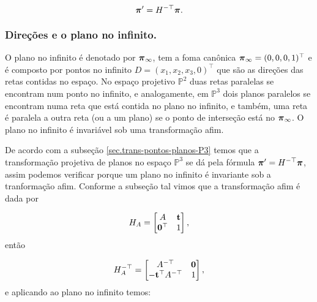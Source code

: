 \begin{equation*}
\boldsymbol{\pi}'=H^{-\top}\boldsymbol{\pi}.
\end{equation*}







\subsubsection{Direções e o plano no infinito.}\label{sec.direcoes-plano-infinito}

O plano no infinito é denotado por $\boldsymbol{\pi}_\infty$, tem a foma canônica $\boldsymbol{\pi}_\infty=(0,0,0,1)^\top$ e é composto por pontos no infinito $D=(x_1,x_2,x_3,0)^\top$ que são as direções das retas contidas no espaço. No espaço projetivo $\mathbb{P}^2$ duas retas paralelas se encontram num ponto no infinito, e analogamente, em  $\mathbb{P}^3$ dois planos paralelos se encontram numa reta que está contida no plano no infinito, e também, uma reta é paralela a outra reta (ou a um plano) se o ponto de interseção está no $\boldsymbol{\pi}_\infty$. O plano no infinito é invariável sob uma transformação afim.

De acordo com a subseção \ref{sec.trans-pontos-planos-P3} temos que a transformação projetiva de planos no espaço  $\mathbb{P}^3$ se dá pela fórmula $\boldsymbol{\pi}'=H^{-\top}\boldsymbol{\pi}$, assim podemos verificar porque um plano no infinito é invariante sob a tranformação afim. Conforme a subseção tal vimos que a transformação afim é dada por 

\begin{equation*}
H_A=
\begin{bmatrix}
A&{\bf t}\\
{\bf 0}^\top&1
\end{bmatrix},
\end{equation*}
então

\begin{equation*}
H_A^{-\top}=
\begin{bmatrix}
A^{-\top}&{\bf 0}\\
-{\bf t}^\top A^{-\top}&1
\end{bmatrix},
\end{equation*}
e aplicando ao plano no infinito temos:

